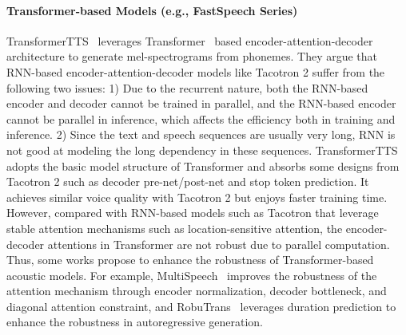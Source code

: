 \documentclass{article}
\begin{document}
\paragraph{Transformer-based Models (e.g., FastSpeech Series)}
TransformerTTS~\cite{li2019neural} leverages Transformer~\cite{vaswani2017attention} based encoder-attention-decoder architecture to generate mel-spectrograms from phonemes. They argue that RNN-based encoder-attention-decoder models like Tacotron 2 suffer from the following two issues: 1) Due to the recurrent nature, both the RNN-based encoder and decoder cannot be trained in parallel, and the RNN-based encoder cannot be parallel in inference, which affects the efficiency both in training and inference. 2) Since the text and speech sequences are usually very long, RNN is not good at modeling the long dependency in these sequences. TransformerTTS adopts the basic model structure of Transformer and absorbs some designs from Tacotron 2 such as decoder pre-net/post-net and stop token prediction. It achieves similar voice quality with Tacotron 2 but enjoys faster training time. However, compared with RNN-based models such as Tacotron that leverage stable attention mechanisms such as location-sensitive attention, the encoder-decoder attentions in Transformer are not robust due to parallel computation. Thus, some works propose to enhance the robustness of Transformer-based acoustic models. For example, MultiSpeech~\cite{chen2020multispeech} improves the robustness of the attention mechanism through encoder normalization, decoder bottleneck, and diagonal attention constraint, and RobuTrans~\cite{li2020robutrans} leverages duration prediction to enhance the robustness in autoregressive generation. 
\end{document}
